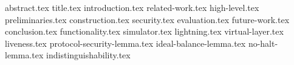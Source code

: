 \documentclass[format=sigconf, anonymous=false]{acmart}
\begin{document}
\pagestyle{plain}

{abstract.tex}
{title.tex}
{introduction.tex}
{related-work.tex}
{high-level.tex}
{preliminaries.tex}
{construction.tex}
{security.tex}
{evaluation.tex}
{future-work.tex}
{conclusion.tex}
{functionality.tex}
{simulator.tex}
{lightning.tex}
{virtual-layer.tex}
{liveness.tex}
{protocol-security-lemma.tex}
{ideal-balance-lemma.tex}
{no-halt-lemma.tex}
{indistinguishability.tex}


\end{document}
